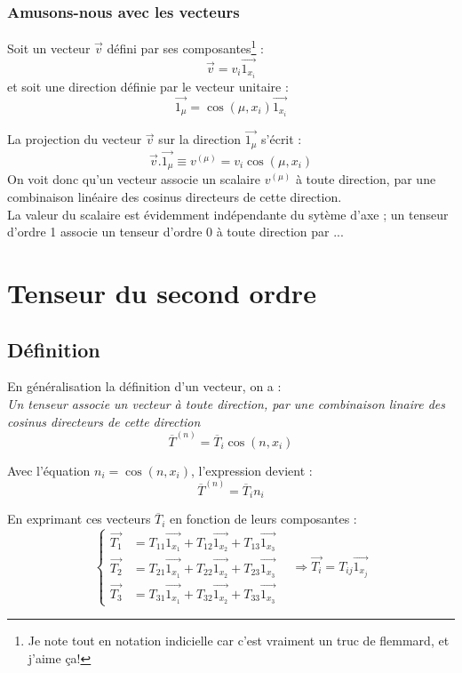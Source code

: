     
\subsubsection{Amusons-nous avec les vecteurs}
Soit un vecteur $\vec{v}$ défini par ses composantes\footnote{Je note tout en notation indicielle
car c'est vraiment un truc de flemmard, et j'aime ça!} :
\begin{equation}
	\vec{v} = v_i\vec{1_{x_i}}
\end{equation}
et soit une direction définie par le vecteur unitaire :
\begin{equation}
	\vec{1_\mu} = \cos(\mu,x_i)\vec{1_{x_i}}
\end{equation}
        
La projection du vecteur $\vec{v}$ sur la direction $\vec{1_\mu}$ s'écrit :
\begin{equation}
	\vec{v}.\vec{1_\mu} \equiv v^{(\mu)} = v_i\cos(\mu, x_i)
\end{equation}
On voit donc qu'un vecteur associe un scalaire $v^{(\mu)}$ à toute direction, par une combinaison
linéaire des cosinus directeurs de cette direction.\\
La valeur du scalaire est évidemment indépendante du sytème d'axe ; un tenseur d'ordre 1 associe un 
tenseur d'ordre 0 à toute direction par ...
        
        
        
\section{Tenseur du second ordre}
\subsection{Définition}
En généralisation la définition d'un vecteur, on a : \\
\textit{Un tenseur associe un vecteur à toute direction, par une combinaison linaire des cosinus
directeurs de cette direction}
\begin{equation}
	\overline{T}^{(n)} = \overline{T}_i\cos(n,x_i)
\end{equation}
    
Avec l'équation $n_i = \cos(n,x_i)$, l'expression devient :
\begin{equation}
	\overline{T}^{(n)} = \overline{T}_in_i
\end{equation}
    
En exprimant ces vecteurs $\overline{T}_i$ en fonction de leurs composantes :
\begin{equation}
	\left\{\begin{array}{ll}
	\vec{T_1}&= T_{11} \vec{1_{x_1}}+T_{12} \vec{1_{x_2}}+T_{13} \vec{1_{x_3}}  \\
	\vec{T_2}&= T_{21} \vec{1_{x_1}}+T_{22} \vec{1_{x_2}}+T_{23} \vec{1_{x_3}}  \\
	\vec{T_3}&= T_{31} \vec{1_{x_1}}+T_{32} \vec{1_{x_2}}+T_{33} \vec{1_{x_3}}  
	\end{array}\right.\ \ \ \ \Rightarrow \vec{T_i} = T_{ij}\vec{1_{x_j}}
\end{equation}

